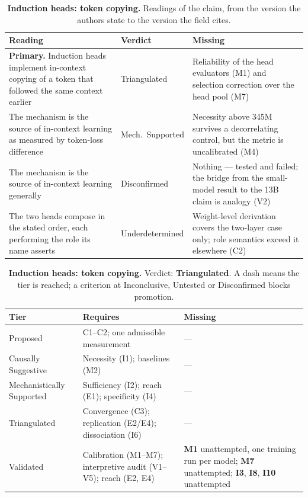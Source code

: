 \clearpage
\begin{table}[H]
\centering
\footnotesize
\caption{\textbf{Induction heads: token copying.} Readings of the claim, from the version the authors state to the version the
field cites.}
\label{tab:induction-readings}
\renewcommand{\arraystretch}{1.18}
\begin{tabular}{@{}>{\raggedright\arraybackslash}p{3.3cm}l>{\raggedright\arraybackslash}p{4.4cm}@{}}
\toprule
\textbf{Reading} & \textbf{Verdict} & \textbf{Missing} \\
\midrule
\textbf{Primary.} Induction heads implement in-context copying of a token that followed the same context earlier
  & Triangulated
  & Reliability of the head evaluators (M1) and selection correction over the head pool (M7) \\
\addlinespace[2pt]
The mechanism is the source of in-context learning as measured by token-loss difference
  & Mech.\ Supported
  & Necessity above 345M survives a decorrelating control, but the metric is uncalibrated (M4) \\
\addlinespace[2pt]
The mechanism is the source of in-context learning generally
  & Disconfirmed
  & Nothing --- tested and failed; the bridge from the small-model result to the 13B claim is analogy (V2) \\
\addlinespace[2pt]
The two heads compose in the stated order, each performing the role its name asserts
  & Underdetermined
  & Weight-level derivation covers the two-layer case only; role semantics exceed it elsewhere (C2) \\
\bottomrule
\end{tabular}
\end{table}

\begin{table}[H]
\centering
\footnotesize
\caption{\textbf{Induction heads: token copying.} Verdict: \textbf{Triangulated}. A dash means the tier is reached; a criterion at
Inconclusive, Untested or Disconfirmed blocks promotion.}
\label{tab:induction-verdict}
\renewcommand{\arraystretch}{1.18}
\begin{tabular}{@{}l>{\raggedright\arraybackslash}p{3.6cm}>{\raggedright\arraybackslash}p{4.4cm}@{}}
\toprule
\textbf{Tier} & \textbf{Requires} & \textbf{Missing} \\
\midrule
Proposed & C1--C2; one admissible measurement & --- \\
\addlinespace[2pt]
Causally Suggestive & Necessity (I1); baselines (M2) & --- \\
\addlinespace[2pt]
Mechanistically Supported & Sufficiency (I2); reach (E1); specificity (I4) & --- \\
\addlinespace[2pt]
Triangulated & Convergence (C3); replication (E2/E4); dissociation (I6) & --- \\
\addlinespace[2pt]
Validated & Calibration (M1--M7); interpretive audit (V1--V5); reach (E2, E4) & \textbf{M1} unattempted, one training run per model; \textbf{M7} unattempted; \textbf{I3}, \textbf{I8}, \textbf{I10} unattempted \\
\bottomrule
\end{tabular}
\end{table}
